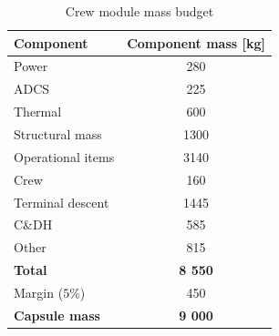 \begin{table}[h]
\centering
\caption{Crew module mass budget}
\label{tab:crewmass}
\begin{tabular}{|l|c|}
\hline
{\bf Component}    & {\bf Component mass {[}kg{]}} \\ \hline \hline
Power              & 280                           \\ \hline
 ADCS        &  225                     \\ \hline
Thermal            & 600                           \\ \hline
Structural mass    & 1300                          \\ \hline
Operational items  & 3140                          \\ \hline
Crew               & 160                           \\ \hline
Terminal descent   & 1445                          \\ \hline
C\&DH              & 585                           \\ \hline 
Other    & 815                          \\ \hline \hline
\textbf{Total}    & \textbf{8 550}                          \\ \hline \hline
Margin ($5\%$)  & 450                        \\ \hline \hline
{\bf Capsule mass} & {\bf 9 000}                    \\ \hline
\end{tabular}
\end{table}


